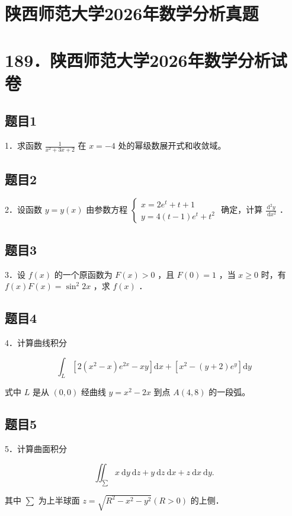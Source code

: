 \documentclass{article}
\begin{document}
\section*{陕西师范大学2026年数学分析真题}
\section*{189．陕西师范大学2026年数学分析试卷}

\subsection{题目1}
1．求函数 \(\frac{1}{x^{2}+3 x+2}\) 在 \(x=-4\) 处的幂级数展开式和收敛域。

\subsection{题目2}
2．设函数 \(y=y(x)\) 由参数方程 \(\left\{\begin{array}{l}x=2 e^{t}+t+1 \\ y=4(t-1) e^{t}+t^{2}\end{array}\right.\) 确定，计算 \(\frac{\mathrm{d}^{2} y}{\mathrm{~d} x^{2}}\) ．

\subsection{题目3}
3．设 \(f(x)\) 的一个原函数为 \(F(x)>0\) ，且 \(F(0)=1\) ，当 \(x \geq 0\) 时，有 \(f(x) F(x)=\sin ^{2} 2 x\) ，求 \(f(x)\) ．

\subsection{题目4}
4．计算曲线积分

\[
\int_{L}\left[2\left(x^{2}-x\right) e^{2 x}-x y\right] \mathrm{d} x+\left[x^{2}-(y+2) e^{y}\right] \mathrm{d} y
\]

式中 \(L\) 是从 \((0,0)\) 经曲线 \(y=x^{2}-2 x\) 到点 \(A(4,8)\) 的一段弧。

\subsection{题目5}
5．计算曲面积分

\[
\iint_{\sum} x \mathrm{~d} y \mathrm{~d} z+y \mathrm{~d} z \mathrm{~d} x+z \mathrm{~d} x \mathrm{~d} y .
\]

其中 \(\sum\) 为上半球面 \(z=\sqrt{R^{2}-x^{2}-y^{2}}(R>0)\) 的上侧．
\end{document}
